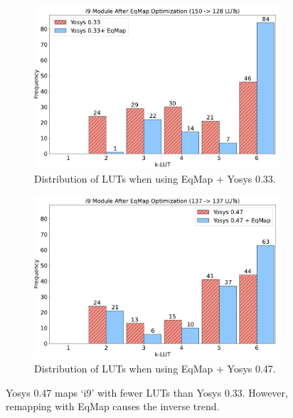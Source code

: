 \begin{figure}
    \begin{subfigure}{0.47\textwidth}
        \centering
        \includegraphics[width=\textwidth]{img/y33.pdf}
        \caption{Distribution of LUTs when using EqMap + Yosys 0.33.}\label{fig:histogram:y33}
    \end{subfigure}
    \hfill\vspace{4mm}
    \begin{subfigure}{0.47\textwidth}
        \centering
        \includegraphics[width=\textwidth]{img/y47.pdf}
        \caption{Distribution of LUTs when using EqMap + Yosys 0.47.}\label{fig:histogram:y47}
    \end{subfigure}
    \caption{Yosys 0.47 maps `i9' with fewer LUTs than Yosys 0.33. However, remapping with EqMap causes the inverse trend.}\label{fig:histogram}
\end{figure}

